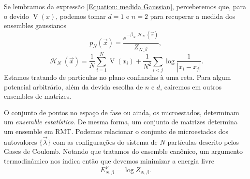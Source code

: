 \documentclass[11pt,twocolumn]{article}
\DeclareMathOperator{\Hf}{\mathcal{H}}
\DeclareMathOperator{\V}{V}
\newcommand{\p}{p} %
\numberwithin{equation}{section} %
\begin{document}
Se lembramos da expressão \ref{Equation: medida Gaussian}, perceberemos que, para o devido $\V(x)$, podemos tomar $d=1$ e $n = 2$ para recuperar a medida dos ensembles gaussianos 
\begin{equation}
	\p_N(\vec{x}) = \frac{e^{-\beta_N \Hf_N(\vec{x})}}{Z_{N,\beta}},
	\label{Equation: Medida Log V}
\end{equation}
\begin{equation}
	\Hf_N(\vec{x}) = \frac{1}{N} \sum_{i = 1}^{N} \V(x_i) + \frac{1}{N^2} \sum_{i < j} \log{\frac{1}{|x_i - x_j|}}.
\end{equation}
Estamos tratando de partículas no plano confinadas à uma reta. Para algum potencial arbitrário, além da devida escolha de $n$ e $d$, cairemos em outros ensembles de matrizes.

O conjunto de pontos no espaço de fase ou ainda, os microestados, determinam um \textit{ensemble estatístico}. De mesma forma, um conjunto de matrizes determina um ensemble em RMT. Podemos relacionar o conjunto de microestados dos autovalores $\{\vec{\lambda}\}$ com as configurações do sistema de $N$ partículas descrito pelos Gases de Coulomb. Notando que tratamos do ensemble canônico, um argumento termodinâmico nos indica então que devemos minimizar a energia livre $$E^V_{N,\beta} = \log{Z_{N, \beta}}.$$
\end{document}
